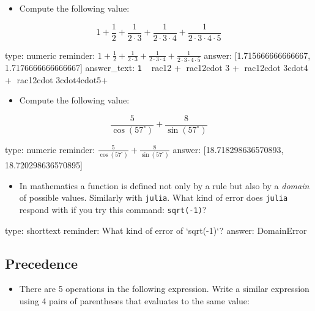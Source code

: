 \documentclass[12pt]{article}
\begin{document}
\begin{itemize}
\itemsep1pt\parskip0pt
\item
  Compute the following value:
\end{itemize}

\[
1 + \frac{1}{2} + \frac{1}{2\cdot 3} + \frac{1}{2\cdot 3\cdot4} + \frac{1}{2\cdot 3\cdot4\cdot5}
\]

\begin{answer}
    type: numeric
    reminder: \(1 + \frac{1}{2} + \frac{1}{2\cdot 3} + \frac{1}{2\cdot 3\cdot4} + \frac{1}{2\cdot 3\cdot4\cdot5}\)
    answer: [1.715666666666667, 1.7176666666666667]
answer_text: \verb+1 + rac{1}{2} + rac{1}{2cdot 3} + rac{1}{2cdot 3cdot4} + rac{1}{2cdot 3cdot4cdot5}+ 
\end{answer}

\begin{itemize}
\itemsep1pt\parskip0pt
\item
  Compute the following value:
\end{itemize}

\[
\frac{5}{\cos(57^\circ)}  + \frac{8}{\sin(57^\circ)}
\]

\begin{answer}
    type: numeric
    reminder: \( \frac{5}{\cos(57^\circ)}  + \frac{8}{\sin(57^\circ)} \)
    answer: [18.718298636570893, 18.720298636570895]

\end{answer}

\begin{itemize}
\itemsep1pt\parskip0pt
\item
  In mathematics a function is defined not only by a rule but also by a
  \emph{domain} of possible values. Similarly with \texttt{julia}. What
  kind of error does \texttt{julia} respond with if you try this
  command: \texttt{sqrt(-1)}?
\end{itemize}

\begin{answer}
type: shorttext
reminder: What kind of error of `sqrt(-1)`?
answer: DomainError

\end{answer}

\subsection{Precedence}

\begin{itemize}
\itemsep1pt\parskip0pt
\item
  There are 5 operations in the following expression. Write a similar
  expression using 4 pairs of parentheses that evaluates to the same
  value:
\end{itemize}
\end{document}
